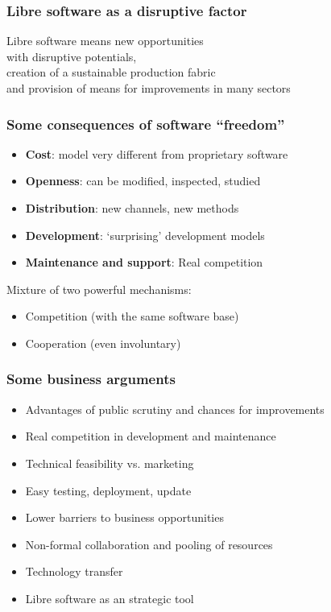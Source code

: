 
\begin{frame}
\frametitle{Libre software as a disruptive factor}

\begin{center}
{\LARGE
Libre software means new opportunities \\
with disruptive potentials, \\
creation of a sustainable production fabric \\
and provision of means for improvements in many sectors
}
\end{center}

\end{frame}


\begin{frame}
\frametitle{Some consequences of software ``freedom''}

\begin{itemize}
\item \textbf{Cost}: model very different from proprietary software
\item \textbf{Openness}: can be modified, inspected, studied
\item \textbf{Distribution}: new channels, new methods
\item \textbf{Development}: `surprising' development models
\item \textbf{Maintenance and support}: Real competition
\end{itemize}

Mixture of two powerful mechanisms:

\begin{itemize}
\item Competition (with the same software base)
\item Cooperation (even involuntary)
\end{itemize}

\end{frame}


\begin{frame}
\frametitle{Some business arguments}

\begin{itemize}
\item Advantages of public scrutiny and chances for improvements
\item Real competition in development and  maintenance
\item Technical feasibility vs. marketing
\item Easy testing, deployment, update
\item Lower barriers to business opportunities
\item Non-formal collaboration and pooling of resources
\item Technology transfer
\item Libre software as an strategic tool
\end{itemize}

\end{frame}


